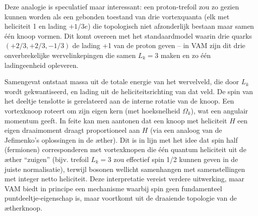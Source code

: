 Deze analogie is speculatief maar interessant: een proton-trefoil zou zo gezien kunnen worden als een gebonden toestand van drie vortexquanta (elk met heliciteit 1 en lading $+1/3e$) die topologisch niet afzonderlijk bestaan maar samen één knoop vormen. Dit komt overeen met het standaardmodel waarin drie quarks $(+2/3,+2/3,-1/3)$ de lading +1 van de proton geven – in VAM zijn dit drie onverbrekelijke wervelinkepingen die samen $L_k=3$ maken en zo één ladingeenheid opleveren.

Samengevat ontstaat massa uit de totale energie van het wervelveld, die door $L_k$ wordt gekwantiseerd, en lading uit de heliciteitsrichting van dat veld. De spin van het deeltje tenslotte is gerelateerd aan de interne rotatie van de knoop. Een vortexknoop roteert om zijn eigen kern (met hoeksnelheid $\Omega_k$), wat een angulair momentum geeft. In feite kan men aantonen dat een knoop met heliciteit $H$ een eigen draaimoment draagt proportioneel aan $H$ (via een analoog van de Jefimenko’s oplossingen in de æther). Dit is in lijn met het idee dat spin half (fermionen) corresponderen met vortexknopen die één quantum heliciteit uit de æther “zuigen” (bijv. trefoil $L_k=3$ zou effectief spin 1/2 kunnen geven in de juiste normalisatie), terwijl bosonen wellicht samenhangen met samenstellingen met integer netto heliciteit. Deze interpretatie vereist verdere uitwerking, maar VAM biedt in principe een mechanisme waarbij spin geen fundamenteel puntdeeltje-eigenschap is, maar voortkomt uit de draaiende topologie van de ætherknoop.